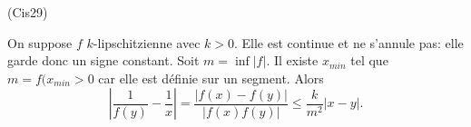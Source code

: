 \begin{tiny}(Cis29)\end{tiny} On suppose $f$ $k$-lipschitzienne avec $k>0$. Elle est continue et ne s'annule pas: elle garde donc un signe constant. Soit $m = \inf |f|$. Il existe $x_{min}$ tel que $m = f(x_{min} > 0$ car elle est définie sur un segment. Alors
\[
  \left| \frac{1}{f(y)} - \frac{1}{x}\right| = \frac{\left|f(x) - f(y)\right|}{\left|f(x) f(y)\right|}
  \leq \frac{k}{m^2} \left|x - y\right|.
\]
